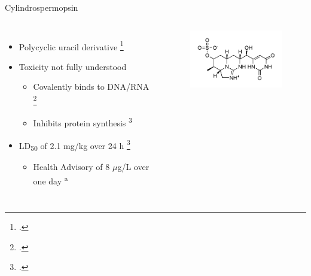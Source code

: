 \begin{frame}{Cylindrospermopsin}

\begin{columns}
	\begin{itemize}
		\item Polycyclic uracil derivative \footcite{moreira_cylindrospermopsin:_2013} 
		\item Toxicity not fully understood 
			\begin{itemize}
				\item Covalently binds to DNA/RNA \footcite{kittler_1._2014} 
				\item Inhibits protein synthesis \textsuperscript{3} 
			\end{itemize}
		\item LD\textsubscript{50} of 2.1 mg/kg over 24 h \footcite{shaw_cylindrospermopsin_2000}
			\begin{itemize}
				\item Health Advisory of 8 $\mu$g/L over one day \textsuperscript{a} 
			\end{itemize}
	\end{itemize}
	\begin{figure}
		\hspace*{-10cm}
		\centering
		\includegraphics[width=2in]{cylindro.png}
	\end{figure}
\end{columns}
\end{frame}
